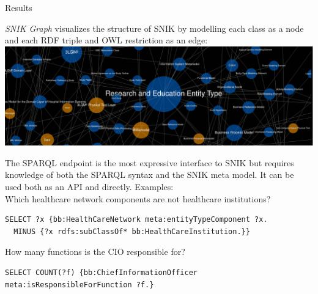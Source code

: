 \documentclass[portrait,final,a0paper,fontscale=0.310]{imiseposter}
\begin{document}
\begin{poster}
\begin{posterbox}[name=results,column=1]{Results}
\begin{tcolorbox}[colback=white,colframe=mediblue,title=SNIK Graph~~~~~~~~~~~~~~~~~~~~~~~~~~~~~~\url{http://www.snik.eu/graph}]
\emph{SNIK Graph} visualizes the structure of SNIK by modelling each class as a node and each RDF triple and OWL restriction as an edge:
\includegraphics[width=\textwidth]{img/snikgraph.png}
\vspace{-1.0em}
\end{tcolorbox}
\vspace{-0.5em}

\begin{tcolorbox}[colback=white,colframe=mediblue,title=SPARQL Endpoint~~~~~~~~~~~~~~~~\url{http://www.snik.eu/sparql}]
The SPARQL endpoint is the most expressive interface to SNIK but requires knowledge of both the SPARQL syntax and the SNIK meta model.
It can be used both as an API and directly. Examples:\\

Which healthcare network components are not healthcare institutions?
\begin{lstlisting}
SELECT ?x {bb:HealthCareNetwork meta:entityTypeComponent ?x.
  MINUS {?x rdfs:subClassOf* bb:HealthCareInstitution.}}
\end{lstlisting}
How many functions is the CIO responsible for?
\begin{lstlisting}
SELECT COUNT(?f) {bb:ChiefInformationOfficer meta:isResponsibleForFunction ?f.}
\end{lstlisting}
%
\vspace{-1.0em}
\end{tcolorbox}
\vspace{-0.5em}


\end{posterbox}
\end{poster}
\end{document}
